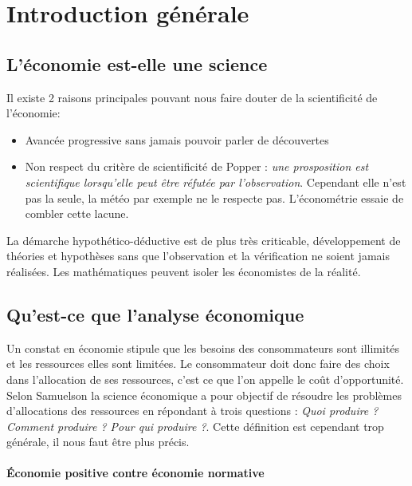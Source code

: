 \section{Introduction générale} %
\label{prt:introduction_generale}

\subsection{L'économie est-elle une science} %
\label{sec:l_economie_est_elle_une_science}
Il existe 2 raisons principales pouvant nous faire douter de la scientificité de l'économie:

\begin{itemize}[label=]
	\item Avancée progressive sans jamais pouvoir parler de découvertes	
	\item Non respect du critère de scientificité de Popper : \emph{une prosposition est scientifique lorsqu'elle peut être réfutée par l'observation}. Cependant elle n'est pas la seule, la météo par exemple ne le respecte pas. L'économétrie essaie de combler cette lacune.
\end{itemize}

La démarche hypothético-déductive est de plus très criticable, développement de théories et hypothèses sans que l'observation et la vérification ne soient jamais réalisées. Les mathématiques peuvent isoler les économistes de la réalité.


\subsection{Qu'est-ce que l'analyse économique} %
\label{sec:qu_est_ce_que_l_analyse_economique}

Un constat en économie stipule que les besoins des consommateurs sont illimités et les ressources elles sont limitées. Le consommateur doit donc faire des choix dans l'allocation de ses ressources, c'est ce que l'on appelle le coût d'opportunité. Selon Samuelson la science économique a pour objectif de résoudre les problèmes d'allocations des ressources en répondant à trois questions : \emph{Quoi produire ? Comment produire ? Pour qui produire ?}. Cette définition est cependant trop générale, il nous faut être plus précis. 

\paragraph{Économie positive contre économie normative} %
\label{par:economie_positive_contre_economie_normative}

